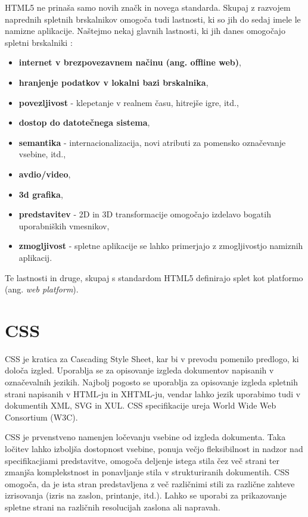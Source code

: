 \documentclass[a4paper, 12pt]{book}
\begin{document}
HTML5 ne prina\v sa samo novih zna\v ck in novega standarda. Skupaj z razvojem naprednih spletnih brskalnikov omogo\v ca tudi lastnosti, ki so jih do sedaj imele le namizne aplikacije. Na\v stejmo nekaj glavnih lastnosti, ki jih danes omogo\v cajo spletni brskalniki
\cite{html5rocks}:

\begin{itemize}
\item \textbf{internet v brezpovezavnem na\v cinu (ang. offline web)},
\item \textbf{hranjenje podatkov v lokalni bazi brskalnika},
\item \textbf{povezljivost} - klepetanje v realnem \v casu, hitrej\v se igre, itd.,
\item \textbf{dostop do datote\v cnega sistema},
\item \textbf{semantika} - internacionalizacija, novi atributi za pomensko ozna\v cevanje vsebine, itd.,
\item \textbf{avdio/video},
\item \textbf{3d grafika},
\item \textbf{predstavitev} - 2D in 3D transformacije omogo\v cajo izdelavo bogatih uporabni\v skih vmesnikov,
\item \textbf{zmogljivost} - spletne aplikacije se lahko primerjajo z zmogljivostjo namiznih aplikacij.
\end{itemize}

Te lastnosti in druge, skupaj s standardom HTML5 definirajo splet kot platformo (ang. \textit{web platform}).

\section{CSS}
CSS je kratica za Cascading Style Sheet, kar bi v prevodu pomenilo predlogo, ki dolo\v ca izgled. Uporablja se za opisovanje izgleda dokumentov napisanih v ozna\v cevalnih jezikih. Najbolj pogosto se uporablja za opisovanje izgleda spletnih strani napisanih v HTML-ju in XHTML-ju, vendar lahko jezik uporabimo tudi v dokumentih XML, SVG in XUL. CSS specifikacije ureja World Wide Web Consortium (W3C).

CSS je prvenstveno namenjen lo\v cevanju vsebine od izgleda dokumenta. Taka lo\v citev lahko izbolj\v sa dostopnost vsebine, ponuja ve\v cjo fleksibilnost in nadzor nad specifikacjiami predstavitve, omogo\v ca deljenje istega stila \v cez ve\v c strani ter zmanj\v sa komplekstnost in ponavljanje stila v strukturiranih dokumentih. CSS omogo\v ca, da je ista stran predstavljena z ve\v c razli\v cnimi stili za razli\v cne zahteve izrisovanja (izris na zaslon, printanje, itd.). Lahko se uporabi za prikazovanje spletne strani na razli\v cnih resolucijah zaslona ali napravah.
\end{document}
